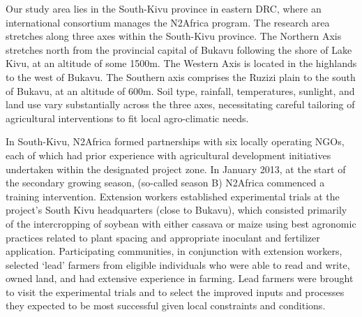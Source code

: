 Our study area lies in the South-Kivu province in eastern DRC, where an international consortium manages the N2Africa program. The research area stretches along three axes within the South-Kivu province. The Northern Axis stretches north from the provincial capital of Bukavu following the shore of Lake Kivu, at an altitude of some 1500m. The Western Axis is located in the highlands to the west of Bukavu. The Southern axis comprises the Ruzizi plain to the south of Bukavu, at an altitude of 600m. Soil type, rainfall, temperatures, sunlight, and land use vary substantially across the three axes, necessitating careful tailoring of agricultural interventions to fit local agro-climatic needs.

In South-Kivu, N2Africa formed partnerships with six locally operating NGOs, each of which had prior experience with agricultural development initiatives undertaken within the designated project zone. In January 2013, at the start of the secondary growing season, (so-called season B)  N2Africa commenced a training intervention.  Extension workers established experimental trials at the project’s South Kivu headquarters (close to Bukavu), which consisted primarily of the intercropping of soybean with either cassava or maize using best agronomic practices related to plant spacing and appropriate inoculant and fertilizer application. Participating communities, in conjunction with extension workers, selected ‘lead’ farmers from eligible individuals who were able to read and write, owned land, and had extensive experience in farming. Lead farmers were brought to visit the experimental trials and to select the improved inputs and processes they expected to be most successful given local constraints and conditions.

